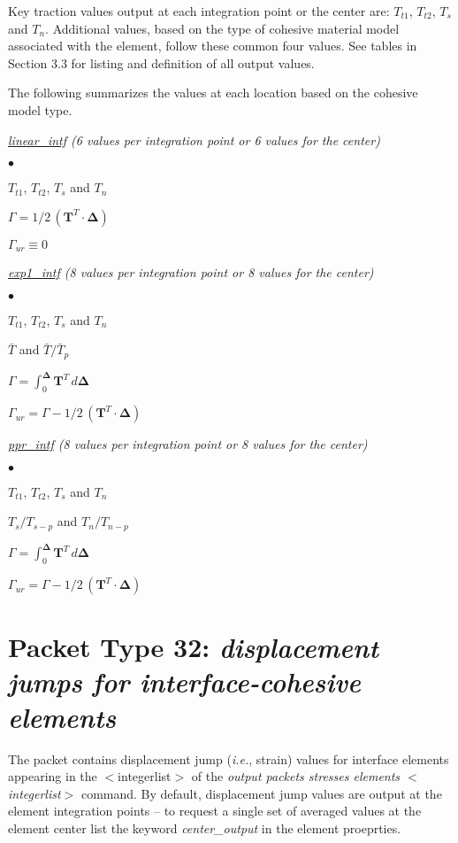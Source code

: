 \documentclass[10pt]{report}
\numberwithin{equation}{section}
\newcommand{\bmf } {\boldsymbol }
\newcommand{\ie}{\ti{i.e.},\xspace}
\newcommand{\ul} {\underline}
\newcommand{\ti}{\emph}
\newcommand{\squishlist}{
 \begin{list}{$\bullet$}
  { \setlength{\itemsep}{0pt}
     \setlength{\parsep}{3pt}
     \setlength{\topsep}{3pt}
     \setlength{\partopsep}{0pt}
     \setlength{\leftmargin}{1.5em}
     \setlength{\labelwidth}{1em}
     \setlength{\labelsep}{0.5em} } }
\newcommand{\squishend}{
  \end{list}  }
\begin{document}
Key traction values output at each integration point or the center are: $T_{t1}$, 
$T_{t2}$, $T_s$ and $T_n$.  Additional values, based on the type of cohesive 
material model associated with the element, follow these common four
values. See tables in Section 3.3 for listing and
definition of all output values. 

The following summarizes the values at each location 
based on the cohesive model type.


\noindent \ti{\ul{linear\_intf} (6 values per integration point or 6 values for the center)}

\squishlist
\item $T_{t1}$, $T_{t2}$, $T_s$ and $T_n$
\item $\Gamma = 1/2 \, ( \bmf{T}^T \cdot \bmf{\Delta} )$
\item $\Gamma_{ur} \equiv 0$
\squishend


\noindent \ti{\ul{exp1\_intf} (8 values per integration point or 8 values for the center)}

\squishlist
\item $T_{t1}$, $T_{t2}$, $T_s$ and $T_n$
\item $\bar T$ and $\bar T / \bar T_p$
\item $\Gamma = \int_0^{\bmf{\Delta}} \bmf{T}^T\, d \bmf{\Delta}$
\item $\Gamma_{ur} = \Gamma -1/2 \, ( \bmf{T}^T \cdot \bmf{\Delta} ) $
\squishend


\noindent \ti{\ul{ppr\_intf} (8 values per integration point or 8 values for the center)}

\squishlist
\item $T_{t1}$, $T_{t2}$, $T_s$ and $T_n$
\item $T_s/T_{s-p}$ and $T_n / T_{n-p}$
\item $\Gamma = \int_0^{\bmf{\Delta}} \bmf{T}^T\, d \bmf{\Delta}$
\item $\Gamma_{ur} = \Gamma -1/2 \, ( \bmf{T}^T \cdot \bmf{\Delta} ) $
\squishend
%
%
\section{Packet Type 32: \ti{displacement jumps for interface-cohesive elements}}
The packet contains displacement jump (\ie strain) values for interface elements appearing in 
the $<$integerlist$>$ of the \ti{output packets stresses
 elements $<$integerlist$>$ }command. By default, displacement jump 
 values are output at the element integration points -- to request a single
 set of averaged values at the element center list the keyword \ti{center\_output}
 in the element proeprties.
 
\end{document}
